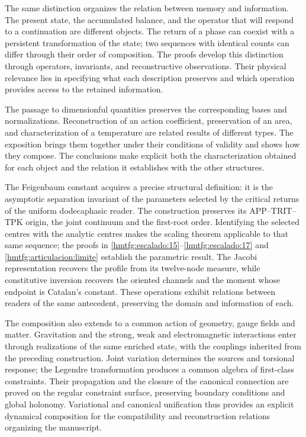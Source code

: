 The same distinction organizes the relation between memory and
information. The present state, the accumulated balance, and the operator
that will respond to a continuation are different objects. The return of
a phase can coexist with a persistent transformation of the state; two
sequences with identical counts can differ through their order of
composition. The proofs develop this distinction through operators,
invariants, and reconstructive observations. Their physical relevance
lies in specifying what each description preserves and which operation
provides access to the retained information.

The passage to dimensionful quantities preserves the corresponding bases
and normalizations. Reconstruction of an action coefficient, preservation
of an area, and characterization of a temperature are related results of
different types. The exposition brings them together under their
conditions of validity and shows how they compose. The conclusions make
explicit both the characterization obtained for each object and the
relation it establishes with the other structures.

The Feigenbaum constant acquires a precise structural definition: it is the asymptotic separation invariant of the parameters selected by the critical returns of the uniform dodecaphasic reader. The construction preserves its APP--TRIT--TPK origin, the joint continuum and the first-root order. Identifying the selected centres with the analytic centres makes the scaling theorem applicable to that same sequence; the proofs in \ref{hmtfg:escalado:15}--\ref{hmtfg:escalado:17} and \eqref{hmtfg:articulacion:limite} establish the parametric result. The Jacobi representation recovers the profile from its twelve-node measure, while constitutive inversion recovers the oriented channels and the moment whose endpoint is Catalan's constant. These operations exhibit relations between readers of the same antecedent, preserving the domain and information of each.

The composition also extends to a common action of geometry, gauge fields and matter. Gravitation and the strong, weak and electromagnetic interactions enter through realizations of the same enriched state, with the couplings inherited from the preceding construction. Joint variation determines the sources and torsional response; the Legendre transformation produces a common algebra of first-class constraints. Their propagation and the closure of the canonical connection are proved on the regular constraint surface, preserving boundary conditions and global holonomy. Variational and canonical unification thus provides an explicit dynamical composition for the compatibility and reconstruction relations organizing the manuscript.

